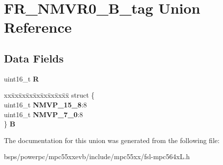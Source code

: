 \hypertarget{unionFR__NMVR0__16B__tag}{}\section{F\+R\+\_\+\+N\+M\+V\+R0\+\_\+B\+\_\+tag Union Reference}
\label{unionFR__NMVR0__16B__tag}
\subsection*{Data Fields}
\begin{DoxyCompactItemize}
\item 
\mbox{\label{unionFR__NMVR0__16B__tag_a9fb435af063e5d31b17f4fd4b9a35ddc}} 
uint16\+\_\+t {\bfseries R}
\item 
\mbox{\label{unionFR__NMVR0__16B__tag_a6e75683e2029f037d00ddadc88a66bd0}} 
\begin{tabbing}
xx\=xx\=xx\=xx\=xx\=xx\=xx\=xx\=xx\=\kill
struct \{\\
\>uint16\_t {\bfseries NMVP\_15\_8}:8\\
\>uint16\_t {\bfseries NMVP\_7\_0}:8\\
\} {\bfseries B}\\

\end{tabbing}\end{DoxyCompactItemize}


The documentation for this union was generated from the following file\+:\begin{DoxyCompactItemize}
\item 
bsps/powerpc/mpc55xxevb/include/mpc55xx/fsl-\/mpc564x\+L.\+h\end{DoxyCompactItemize}
